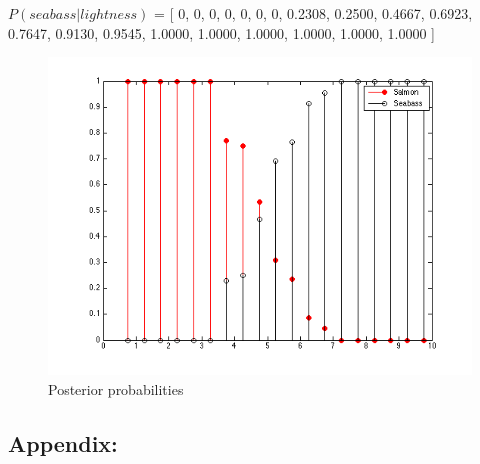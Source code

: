 \documentclass[a4paper]{article}
\begin{document}
$P(seabass|lightness)$ = [
         0,
         0,
         0,
         0,
         0,
         0,
         0,
    0.2308,
    0.2500,
    0.4667,
    0.6923,
    0.7647,
    0.9130,
    0.9545,
    1.0000,
    1.0000,
    1.0000,
    1.0000,
    1.0000,
    1.0000 ]

\begin{figure}[H]
  \centering
    \includegraphics[scale=.6]{images/posterior_probabilities.png}
  \caption{Posterior probabilities}
\end{figure}

\newpage
\subsection*{Appendix:}

\end{document}
